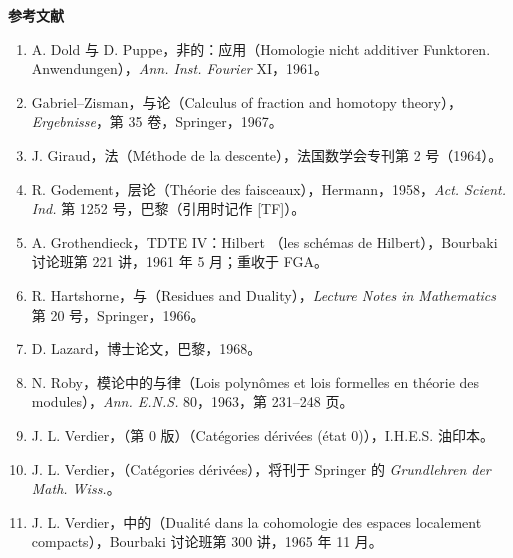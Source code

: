 \textbf{参考文献}
\begin{enumerate}
\item[{[1]}] A. Dold 与 D. Puppe，非的：应用（Homologie nicht additiver Funktoren. Anwendungen），\emph{Ann. Inst. Fourier} XI，1961。
\item[{[2]}] Gabriel--Zisman，与论（Calculus of fraction and homotopy theory），\emph{Ergebnisse}，第 35 卷，Springer，1967。
\item[{[3]}] J. Giraud，法（Méthode de la descente），法国数学会专刊第 2 号（1964）。
\item[{[4]}] R. Godement，层论（Théorie des faisceaux），Hermann，1958，\emph{Act. Scient. Ind.} 第 1252 号，巴黎（引用时记作 [TF]）。
\item[{[5]}] A. Grothendieck，TDTE IV：Hilbert （les schémas de Hilbert），Bourbaki 讨论班第 221 讲，1961 年 5 月；重收于 FGA。
\item[{[6]}] R. Hartshorne，与（Residues and Duality），\emph{Lecture Notes in Mathematics} 第 20 号，Springer，1966。
\item[{[7]}] D. Lazard，博士论文，巴黎，1968。
\item[{[8]}] N. Roby，模论中的与律（Lois polynômes et lois formelles en théorie des modules），\emph{Ann. E.N.S.} 80，1963，第 231--248 页。
\item[{[9]}] J. L. Verdier，（第 0 版）（Catégories dérivées (état 0)），I.H.E.S. 油印本。
\item[{[10]}] J. L. Verdier，（Catégories dérivées），将刊于 Springer 的 \emph{Grundlehren der Math. Wiss.}。
\item[{[11]}] J. L. Verdier，中的（Dualité dans la cohomologie des espaces localement compacts），Bourbaki 讨论班第 300 讲，1965 年 11 月。
\end{enumerate}
